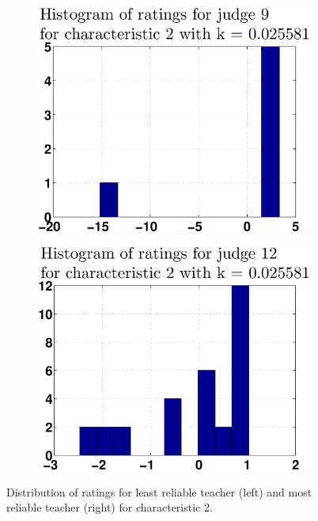 \documentclass[12pt,a4paper]{article}
\begin{document}
\begin{figure}[!h]
\centering
\begin{subfigure}[b]{0.45\textwidth}
\centering
\includegraphics[width = \textwidth]{preprocess/ppdistribLeastRelK406ff9f387c1ccacc2.eps}
\end{subfigure}
\begin{subfigure}[b]{0.45\textwidth}
\centering
\includegraphics[width = \textwidth]{preprocess/ppdistribMostRelK406ff9f387c1ccacc2.eps}
\end{subfigure}
\caption{\label{hlhist}Distribution of ratings for least reliable teacher (left) and most reliable teacher (right) for characteristic 2.}
\end{figure}
\FloatBarrier
\end{document}
